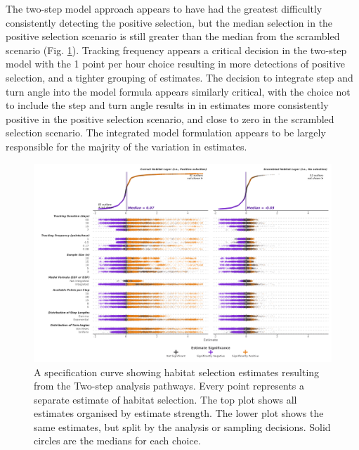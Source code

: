 \documentclass[10pt,a4paper]{article}
\begin{document}
The two-step model approach appears to have had the greatest difficultly consistently detecting the positive selection, but the median selection in the positive selection scenario is still greater than the median from the scrambled scenario (Fig. \ref{fig:specCurveTwoStep}).
Tracking frequency appears a critical decision in the two-step model with the 1 point per hour choice resulting in more detections of positive selection, and a tighter grouping of estimates.
The decision to integrate step and turn angle into the model formula appears similarly critical, with the choice not to include the step and turn angle results in in estimates more consistently positive in the positive selection scenario, and close to zero in the scrambled selection scenario.
The integrated model formulation appears to be largely responsible for the majrity of the variation in estimates.

\begin{figure}
\includegraphics[width=1\linewidth]{../figures/twoStep_specCurve} \caption{A specification curve showing habitat selection estimates resulting from the Two-step analysis pathways. Every point represents a separate estimate of habitat selection. The top plot shows all estimates organised by estimate strength. The lower plot shows the same estimates, but split by the analysis or sampling decisions. Solid circles are the medians for each choice.}\label{fig:specCurveTwoStep}
\end{figure}
\end{document}
